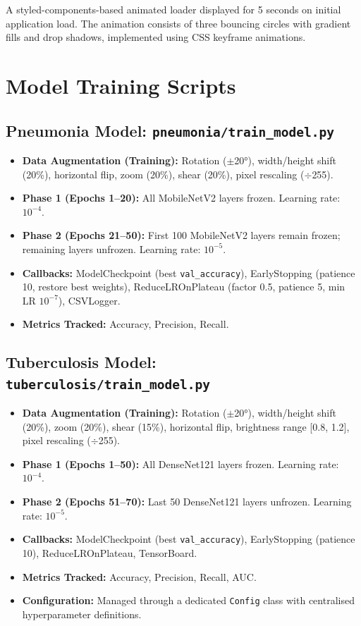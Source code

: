 \documentclass[12pt, a4paper, oneside]{report}
\begin{document}
A styled-components-based animated loader displayed for 5 seconds on initial application load. The animation consists of three bouncing circles with gradient fills and drop shadows, implemented using CSS keyframe animations.

\section{Model Training Scripts}
\label{sec:training_scripts}

\subsection{Pneumonia Model: \texttt{pneumonia/train\_model.py}}

\begin{itemize}
    \item \textbf{Data Augmentation (Training):} Rotation ($\pm$20°), width/height shift (20\%), horizontal flip, zoom (20\%), shear (20\%), pixel rescaling ($\div$255).
    \item \textbf{Phase 1 (Epochs 1--20):} All MobileNetV2 layers frozen. Learning rate: $10^{-4}$.
    \item \textbf{Phase 2 (Epochs 21--50):} First 100 MobileNetV2 layers remain frozen; remaining layers unfrozen. Learning rate: $10^{-5}$.
    \item \textbf{Callbacks:} ModelCheckpoint (best \texttt{val\_accuracy}), EarlyStopping (patience 10, restore best weights), ReduceLROnPlateau (factor 0.5, patience 5, min LR $10^{-7}$), CSVLogger.
    \item \textbf{Metrics Tracked:} Accuracy, Precision, Recall.
\end{itemize}

\subsection{Tuberculosis Model: \texttt{tuberculosis/train\_model.py}}

\begin{itemize}
    \item \textbf{Data Augmentation (Training):} Rotation ($\pm$20°), width/height shift (20\%), zoom (20\%), shear (15\%), horizontal flip, brightness range [0.8, 1.2], pixel rescaling ($\div$255).
    \item \textbf{Phase 1 (Epochs 1--50):} All DenseNet121 layers frozen. Learning rate: $10^{-4}$.
    \item \textbf{Phase 2 (Epochs 51--70):} Last 50 DenseNet121 layers unfrozen. Learning rate: $10^{-5}$.
    \item \textbf{Callbacks:} ModelCheckpoint (best \texttt{val\_accuracy}), EarlyStopping (patience 10), ReduceLROnPlateau, TensorBoard.
    \item \textbf{Metrics Tracked:} Accuracy, Precision, Recall, AUC.
    \item \textbf{Configuration:} Managed through a dedicated \texttt{Config} class with centralised hyperparameter definitions.
\end{itemize}
\end{document}
